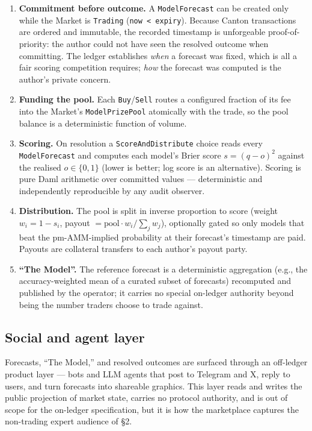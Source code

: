 \documentclass[11pt,a4paper]{article}
\begin{document}
\begin{enumerate}[leftmargin=2em, itemsep=3pt]
\item \textbf{Commitment before outcome.} A \texttt{ModelForecast} can be created only while the Market is \texttt{Trading} (\texttt{now < expiry}). Because Canton transactions are ordered and immutable, the recorded timestamp is unforgeable proof-of-priority: the author could not have seen the resolved outcome when committing. The ledger establishes \emph{when} a forecast was fixed, which is all a fair scoring competition requires; \emph{how} the forecast was computed is the author's private concern.
\item \textbf{Funding the pool.} Each \texttt{Buy}/\texttt{Sell} routes a configured fraction of its fee into the Market's \texttt{ModelPrizePool} atomically with the trade, so the pool balance is a deterministic function of volume.
\item \textbf{Scoring.} On resolution a \texttt{ScoreAndDistribute} choice reads every \texttt{ModelForecast} and computes each model's Brier score $s = (q - o)^2$ against the realised $o \in \{0,1\}$ (lower is better; log score is an alternative). Scoring is pure Daml arithmetic over committed values --- deterministic and independently reproducible by any audit observer.
\item \textbf{Distribution.} The pool is split in inverse proportion to score (weight $w_i = 1 - s_i$, payout $= \text{pool}\cdot w_i / \sum_j w_j$), optionally gated so only models that beat the pm-AMM-implied probability at their forecast's timestamp are paid. Payouts are collateral transfers to each author's payout party.
\item \textbf{``The Model''.} The reference forecast is a deterministic aggregation (e.g., the accuracy-weighted mean of a curated subset of forecasts) recomputed and published by the operator; it carries no special on-ledger authority beyond being the number traders choose to trade against.
\end{enumerate}

\subsection{Social and agent layer}

Forecasts, ``The Model,'' and resolved outcomes are surfaced through an off-ledger product layer --- bots and LLM agents that post to Telegram and X, reply to users, and turn forecasts into shareable graphics. This layer reads and writes the public projection of market state, carries no protocol authority, and is out of scope for the on-ledger specification, but it is how the marketplace captures the non-trading expert audience of \S2.
\end{document}
